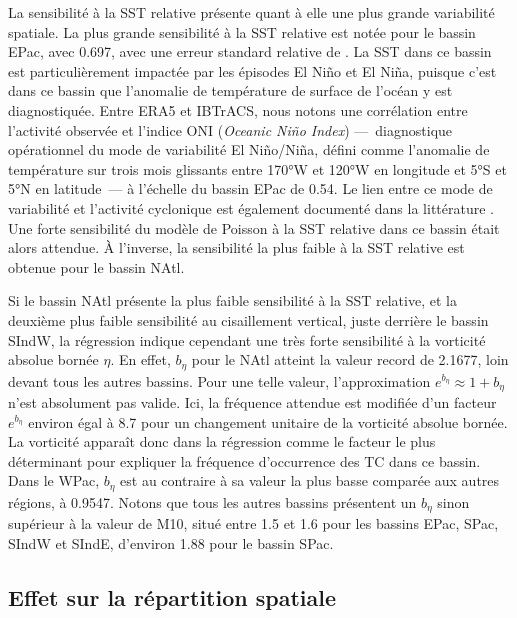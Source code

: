 \documentclass[../main.tex]{subfiles}
\begin{document}
La sensibilité à la SST relative présente quant à elle une plus grande variabilité spatiale. La plus grande sensibilité à la SST relative est notée pour le
bassin EPac, avec \num{0.697}, avec une erreur standard relative de . La SST dans ce bassin est particulièrement impactée par les épisodes El Niño et El
Niña, puisque c'est dans ce bassin que l'anomalie de température de surface de l'océan y est diagnostiquée. Entre ERA5 et IBTrACS, nous notons une corrélation
entre l'activité observée et l'indice ONI (\textit{Oceanic Niño Index}) ---~diagnostique opérationnel du mode de variabilité El Niño/Niña, défini comme
l'anomalie de température sur trois mois glissants entre \ang{170}W et \ang{120}W en longitude et \ang{5}S et \ang{5}N en latitude~--- à l'échelle du bassin
EPac de \num{0.54}. Le lien entre ce mode de variabilité et l'activité cyclonique est également documenté dans la littérature
\parencite{camargo_use_2007,lin_enso_2020}. Une forte sensibilité du modèle de Poisson à la SST relative dans ce bassin était alors attendue. À l'inverse, la
sensibilité la plus faible à la SST relative est obtenue pour le bassin NAtl.

Si le bassin NAtl présente la plus faible sensibilité à la SST relative, et la deuxième plus faible sensibilité au cisaillement vertical, juste derrière le
bassin SIndW, la régression indique cependant une très forte sensibilité à la vorticité absolue bornée $\eta$. En effet, $b_\eta$ pour le NAtl atteint la valeur
record de \num{2.1677}, loin devant tous les autres bassins. Pour une telle valeur, l'approximation $e^{b_\eta} \approx 1 + b_\eta$ n'est absolument pas valide.
Ici, la fréquence attendue est modifiée d'un facteur $e^{b_\eta}$ environ égal à \num{8.7} pour un changement unitaire de la vorticité absolue bornée. La
vorticité apparaît donc dans la régression comme le facteur le plus déterminant pour expliquer la fréquence d'occurrence des TC dans ce bassin. Dans le WPac,
$b_\eta$ est au contraire à sa valeur la plus basse comparée aux autres régions, à \num{0.9547}. Notons que tous les autres bassins présentent un $b_\eta$ sinon
supérieur à la valeur de M10, situé entre \num{1.5} et \num{1.6} pour les bassins EPac, SPac, SIndW et SIndE, d'environ \num{1.88} pour le bassin SPac.

\subsection{Effet sur la répartition spatiale}\label{sec:lm10_effet_spatial}
\end{document}
